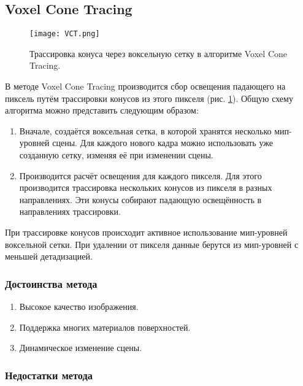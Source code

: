 \documentclass[12pt,fleqn]{article}
\begin{document}
\subsection{Voxel Cone Tracing}

\begin{figure}[htb]
    \centering
    \texttt{[image: VCT.png]}
    \caption{Трассировка конуса через воксельную сетку в алгоритме Voxel Cone Tracing.}
    \label{vct}
\end{figure}

В методе Voxel Cone Tracing \cite{VoxelConeTracing} производится сбор освещения падающего на пиксель путём трассировки конусов из этого пикселя (рис. \ref{vct}). Общую схему алгоритма можно представить следующим образом:

\begin{enumerate}

\item Вначале, создаётся воксельная сетка, в которой хранятся несколько мип-уровней сцены. Для каждого нового кадра можно использовать уже созданную сетку, изменяя её при изменении сцены.

\item Производится расчёт освещения для каждого пикселя. Для этого производится трассировка нескольких конусов из пикселя в разных направлениях. Эти конусы собирают падающую освещённость в направлениях трассировки.

\end{enumerate}

При трассировке конусов происходит активное использование мип-уровней воксельной сетки. При удалении от пикселя данные берутся из мип-уровней с меньшей детадизацией.

\subsubsection{Достоинства метода}

\begin{enumerate}

\item Высокое качество изображения.

\item Поддержка многих материалов поверхностей.

\item Динамическое изменение сцены.

\end{enumerate}

\subsubsection{Недостатки метода}
\end{document}
